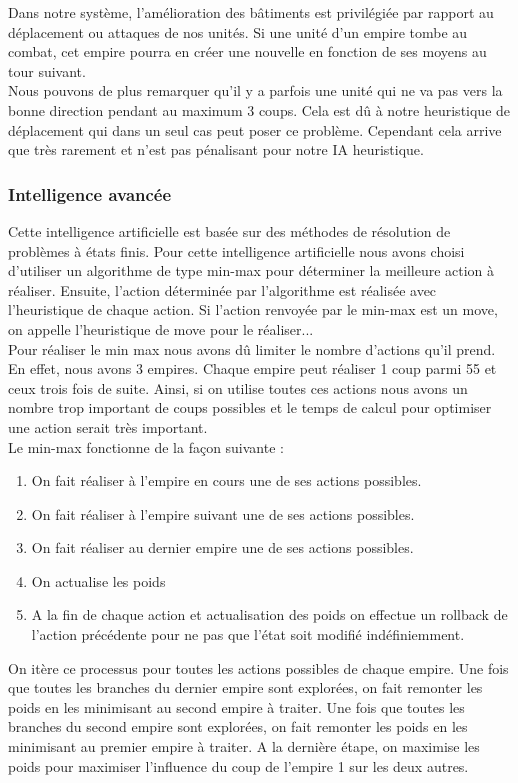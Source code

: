 \documentclass[12pt,a4paper]{article}
\begin{document}
Dans notre système, l'amélioration des bâtiments est privilégiée par rapport au déplacement ou attaques de nos unités. Si une unité d'un empire tombe au combat, cet empire pourra en créer une nouvelle en fonction de ses moyens au tour suivant.
\\Nous pouvons de plus remarquer qu'il y a parfois une unité qui ne va pas vers la bonne direction pendant au maximum 3 coups. Cela est dû à notre heuristique de déplacement qui dans un seul cas peut poser ce problème. Cependant cela arrive que très rarement et n'est pas pénalisant pour notre IA heuristique.

\subsubsection{Intelligence avancée}
Cette intelligence artificielle est basée sur des méthodes de résolution de problèmes à états finis. Pour cette intelligence artificielle nous avons choisi d'utiliser un algorithme de type min-max pour déterminer la meilleure action à réaliser. Ensuite, l'action déterminée par l'algorithme est réalisée avec l'heuristique de chaque action. Si l'action renvoyée par le min-max est un move, on appelle l'heuristique de move pour le réaliser... \\
Pour réaliser le min max nous avons dû limiter le nombre d'actions qu'il prend. En effet, nous avons 3 empires. Chaque empire peut réaliser 1 coup parmi 55 et ceux trois fois de suite. Ainsi, si on utilise toutes ces actions nous avons un nombre trop important de coups possibles et le temps de calcul pour optimiser une action serait très important.\\
Le min-max fonctionne de la façon suivante : 
\begin{enumerate}
    \item On fait réaliser à l'empire en cours une de ses actions possibles. 
    \item On fait réaliser à l'empire suivant une de ses actions possibles. 
    \item On fait réaliser au dernier empire une de ses actions possibles. 
    \item On actualise les poids
    \item A la fin de chaque action et actualisation des poids on effectue un rollback de l'action précédente pour ne pas que l'état soit modifié indéfiniemment.
\end{enumerate}
On itère ce processus pour toutes les actions possibles de chaque empire. Une fois que toutes les branches du dernier empire sont explorées, on fait remonter les poids en les minimisant au second empire à traiter. Une fois que toutes les branches du second empire sont explorées, on fait remonter les poids en les minimisant au premier empire à traiter. A la dernière étape, on maximise les poids pour maximiser l'influence du coup de l'empire 1 sur les deux autres. 
\end{document}
